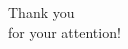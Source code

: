 % 

\begin{frame}{}
  \begin{center}
    \textcolor{kit-green100}{\Huge Thank you\\for your attention!\vspace{1em}}

  \end{center}
\end{frame}
